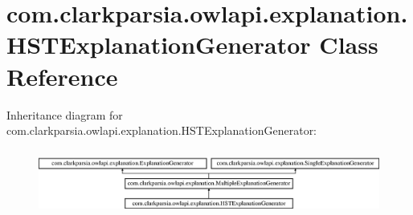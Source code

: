 \hypertarget{classcom_1_1clarkparsia_1_1owlapi_1_1explanation_1_1_h_s_t_explanation_generator}{\section{com.\-clarkparsia.\-owlapi.\-explanation.\-H\-S\-T\-Explanation\-Generator Class Reference}
\label{classcom_1_1clarkparsia_1_1owlapi_1_1explanation_1_1_h_s_t_explanation_generator}
}
Inheritance diagram for com.\-clarkparsia.\-owlapi.\-explanation.\-H\-S\-T\-Explanation\-Generator\-:\begin{figure}[H]
\begin{center}
\leavevmode
\includegraphics[height=2.164948cm]{classcom_1_1clarkparsia_1_1owlapi_1_1explanation_1_1_h_s_t_explanation_generator}
\end{center}
\end{figure}
